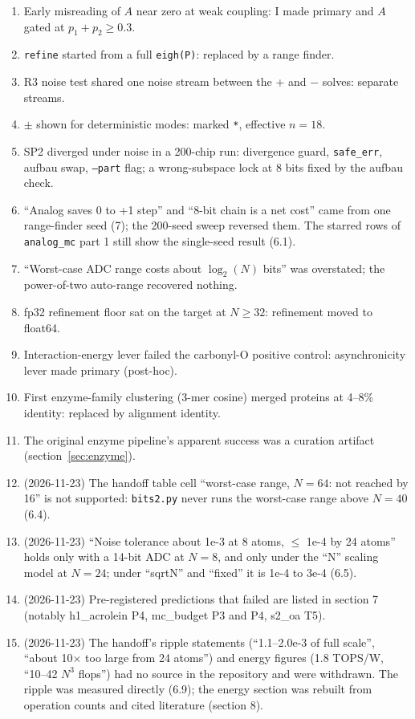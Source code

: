 \documentclass[11pt]{article}
\newcommand{\x}{$\times$}
\newcommand{\scr}[1]{\texttt{#1}}
\begin{document}
\begin{enumerate}
  \item Early misreading of $A$ near zero at weak coupling: I made primary and $A$ gated at $p_1 + p_2 \geq 0.3$.
  \item \scr{refine} started from a full \scr{eigh(P)}: replaced by a range finder.
  \item R3 noise test shared one noise stream between the + and $-$ solves: separate streams.
  \item $\pm$ shown for deterministic modes: marked \texttt{*}, effective $n = 18$.
  \item SP2 diverged under noise in a 200-chip run: divergence guard, \scr{safe\_err}, aufbau swap, \scr{--part} flag; a wrong-subspace lock at 8 bits fixed by the aufbau check.
  \item ``Analog saves 0 to +1 step'' and ``8-bit chain is a net cost'' came from one range-finder seed (7); the 200-seed sweep reversed them. The starred rows of \scr{analog\_mc} part 1 still show the single-seed result (6.1).
  \item ``Worst-case ADC range costs about $\log_2(N)$ bits'' was overstated; the power-of-two auto-range recovered nothing.
  \item fp32 refinement floor sat on the target at $N \geq 32$: refinement moved to float64.
  \item Interaction-energy lever failed the carbonyl-O positive control: asynchronicity lever made primary (post-hoc).
  \item First enzyme-family clustering (3-mer cosine) merged proteins at 4--8\% identity: replaced by alignment identity.
  \item The original enzyme pipeline's apparent success was a curation artifact (section~\ref{sec:enzyme}).
  \item (2026-11-23) The handoff table cell ``worst-case range, $N = 64$: not reached by 16'' is not supported: \scr{bits2.py} never runs the worst-case range above $N = 40$ (6.4).
  \item (2026-11-23) ``Noise tolerance about 1e-3 at 8 atoms, $\leq$ 1e-4 by 24 atoms'' holds only with a 14-bit ADC at $N = 8$, and only under the ``N'' scaling model at $N = 24$; under ``sqrtN'' and ``fixed'' it is 1e-4 to 3e-4 (6.5).
  \item (2026-11-23) Pre-registered predictions that failed are listed in section 7 (notably h1\_acrolein P4, mc\_budget P3 and P4, s2\_oa T5).
  \item (2026-11-23) The handoff's ripple statements (``1.1--2.0e-3 of full scale'', ``about 10\x{} too large from 24 atoms'') and energy figures (1.8 TOPS/W, ``10--42 $N^3$ flops'') had no source in the repository and were withdrawn. The ripple was measured directly (6.9); the energy section was rebuilt from operation counts and cited literature (section 8).
\end{enumerate}
\end{document}
